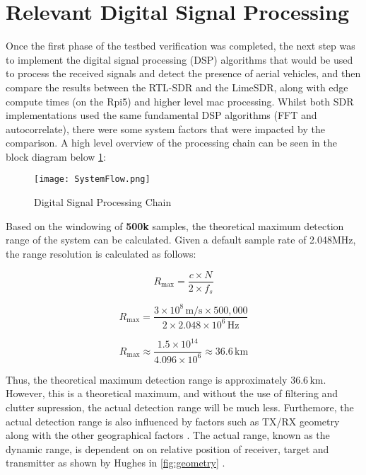 \section{Relevant Digital Signal Processing}

Once the first phase of the testbed verification was completed, the next step was to implement the digital signal processing (DSP) algorithms that would be used to process the received signals and detect the presence of aerial vehicles, and then compare the results between the RTL-SDR and the LimeSDR, along with edge compute times (on the Rpi5) and higher level mac processing. Whilst both SDR implementations used the same fundamental DSP algorithms (FFT and autocorrelate), there were some system factors that were impacted by the comparison. A high level overview of the processing chain can be seen in the block diagram below \ref{fig:processingChain}:

\begin{figure}[htbp]
    \centering
    \texttt{[image: SystemFlow.png]}
    \caption{Digital Signal Processing Chain}
    \label{fig:processingChain}
\end{figure}

Based on the windowing of \textbf{500k} samples, the theoretical maximum detection range of the system can be calculated. Given a default sample rate of 2.048MHz, the range resolution is calculated as follows: 

\[
R_{\text{max}} = \frac{c \times N}{2 \times f_s}
\]

\[
R_{\text{max}} = \frac{3 \times 10^8 \, \text{m/s} \times 500,000}{2 \times 2.048 \times 10^6 \, \text{Hz}}
\]

\[
R_{\text{max}} \approx \frac{1.5 \times 10^{14}}{4.096 \times 10^6} \approx 36.6 \, \text{km}
\]

Thus, the theoretical maximum detection range is approximately \( 36.6 \, \text{km} \). However, this is a theoretical maximum, and without the use of filtering and clutter supression, the actual detection range will be much less. Furthemore, the actual detection range is also influenced by factors such as TX/RX geometry along with the other geographical factors \cite{DTSO2009}. The actual range, known as the dynamic range, is dependent on on relative position of receiver, target and transmitter as shown by Hughes in \ref{fig:geometry} \cite{FundamentalsPassiveRadar}.



